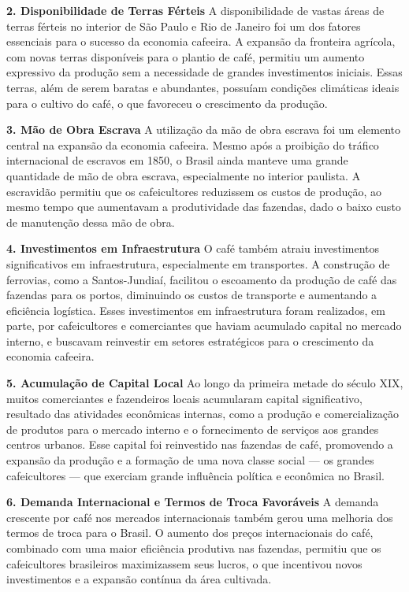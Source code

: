 \documentclass[a4paper,12pt]{article}[abntex2]
\begin{document}
\textbf{2. Disponibilidade de Terras Férteis}
A disponibilidade de vastas áreas de terras férteis no interior de São Paulo e Rio de Janeiro foi um dos fatores essenciais para o sucesso da economia cafeeira. A expansão da fronteira agrícola, com novas terras disponíveis para o plantio de café, permitiu um aumento expressivo da produção sem a necessidade de grandes investimentos iniciais. Essas terras, além de serem baratas e abundantes, possuíam condições climáticas ideais para o cultivo do café, o que favoreceu o crescimento da produção.

\textbf{3. Mão de Obra Escrava}
A utilização da mão de obra escrava foi um elemento central na expansão da economia cafeeira. Mesmo após a proibição do tráfico internacional de escravos em 1850, o Brasil ainda manteve uma grande quantidade de mão de obra escrava, especialmente no interior paulista. A escravidão permitiu que os cafeicultores reduzissem os custos de produção, ao mesmo tempo que aumentavam a produtividade das fazendas, dado o baixo custo de manutenção dessa mão de obra.

\textbf{4. Investimentos em Infraestrutura}
O café também atraiu investimentos significativos em infraestrutura, especialmente em transportes. A construção de ferrovias, como a Santos-Jundiaí, facilitou o escoamento da produção de café das fazendas para os portos, diminuindo os custos de transporte e aumentando a eficiência logística. Esses investimentos em infraestrutura foram realizados, em parte, por cafeicultores e comerciantes que haviam acumulado capital no mercado interno, e buscavam reinvestir em setores estratégicos para o crescimento da economia cafeeira.

\textbf{5. Acumulação de Capital Local}
Ao longo da primeira metade do século XIX, muitos comerciantes e fazendeiros locais acumularam capital significativo, resultado das atividades econômicas internas, como a produção e comercialização de produtos para o mercado interno e o fornecimento de serviços aos grandes centros urbanos. Esse capital foi reinvestido nas fazendas de café, promovendo a expansão da produção e a formação de uma nova classe social — os grandes cafeicultores — que exerciam grande influência política e econômica no Brasil.

\textbf{6. Demanda Internacional e Termos de Troca Favoráveis}
A demanda crescente por café nos mercados internacionais também gerou uma melhoria dos termos de troca para o Brasil. O aumento dos preços internacionais do café, combinado com uma maior eficiência produtiva nas fazendas, permitiu que os cafeicultores brasileiros maximizassem seus lucros, o que incentivou novos investimentos e a expansão contínua da área cultivada.
\end{document}
